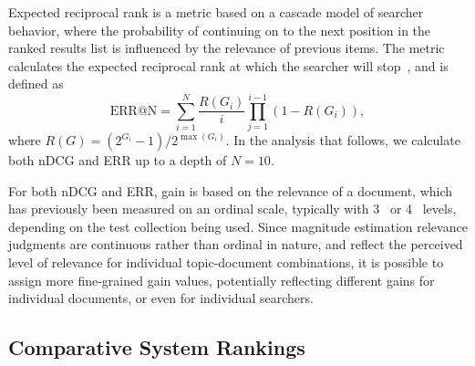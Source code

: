 Expected reciprocal rank is 
a
metric based on a cascade
model of searcher behavior, where the probability of continuing on to
the next position in the ranked results list is influenced by the
relevance of previous items. The metric calculates the expected
reciprocal rank at which the searcher will stop~\citep{ChaMet09}, and is defined
as
\[
  \mathrm{ ERR@N} = \sum^{N}_{i=1} \frac{R(G_i)}{i} \prod^{i-1}_{j=1}(1 - R(G_i)),
\]
\noindent where $R(G) = (2^{G_i}-1) / 2^{\max(G_i)}$. 
In the analysis that follows, we calculate both nDCG and ERR
up to a depth of $N=10$.

For both nDCG and ERR, gain is based on the relevance of a document,
which has previously been measured on an ordinal scale, typically with
3~\cite{KanAsl03} or 4~\cite{JarKek02} levels, depending on the test
collection being used.
Since magnitude estimation relevance judgments are continuous rather
than ordinal in nature, and reflect the perceived level of relevance
for individual topic-document combinations, it is possible to assign
more fine-grained gain values, potentially reflecting different gains
for individual documents, or even for individual searchers.

\subsection{Comparative System Rankings}
\label{sec:ranking-trec-runs}


